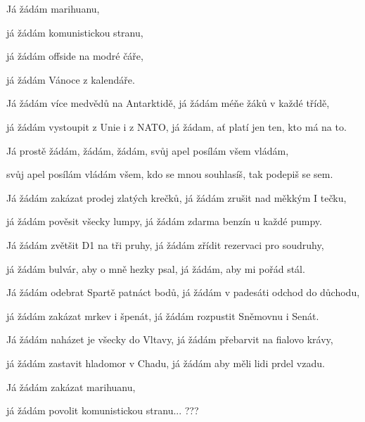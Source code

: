 

\zs
Já žádám  marihuanu,

já žádám  komunistickou stranu,

já žádám  offside na modré čáře,

já žádám  Vánoce z kalendáře.
\ks

\zs
Já žádám více medvědů na Antarktidě, já žádám méňe žáků v každé třídě,

já žádám vystoupit z Unie i z NATO, já žádam, ať platí jen ten, kto má na to.
\ks

\zr
Já prostě žádám, žádám, žádám, svůj apel posílám všem vládám,

svůj apel posílám vládám všem, kdo se mnou souhlasíš, tak podepiš se sem.
\kr

\zs
Já žádám zakázat prodej zlatých krečků, já žádám zrušit nad měkkým I tečku,

já žádám pověsit všecky lumpy, já žádám zdarma benzín u každé pumpy.
\ks

\zs
Já žádám zvětšit D1 na tři pruhy, já žádám zřídit rezervaci pro soudruhy,

já žádám bulvár, aby o mně hezky psal, já žádám, aby mi pořád stál.
\ks

\zr\kr

\zs
Já žádám odebrat Spartě patnáct bodů, já žádám v padesáti odchod do důchodu,

já žádám zakázat mrkev i špenát, já žádám rozpustit Sněmovnu i Senát.
\ks

\zs
Já žádám naházet je všecky do Vltavy, já žádám přebarvit na fialovo krávy,

já žádám zastavit hladomor v Chadu, já žádám aby měli lidi prdel vzadu.
\ks

\zr\kr

\zs
Já žádám zakázat marihuanu,

já žádám povolit komunistickou stranu... ???
\ks

\kp
